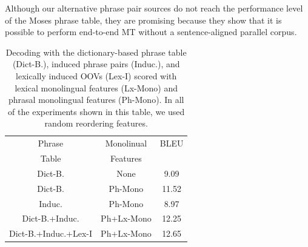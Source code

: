 \documentclass[11pt]{article}
\begin{document}
Although our alternative phrase pair sources do not reach the performance level of the Moses phrase table, they are promising because they show that it is possible to perform end-to-end MT without a sentence-aligned parallel corpus. %



\begin{table}
\small
\begin{center}
\begin{tabular}{|c|c|c|}
\hline
Phrase 	& Monolinual  & 	BLEU \\
Table	& Features &  \\
\hline
Dict-B. & None & 9.09 \\
Dict-B. & Ph-Mono & 11.52 \\
Induc. & Ph-Mono &  8.97 \\
Dict-B.+Induc. & Ph+Lx-Mono & 12.25 \\
Dict-B.+Induc.+Lex-I & Ph+Lx-Mono & 12.65 \\
\hline
\end{tabular}
\caption{Decoding with the dictionary-based phrase table (Dict-B.), induced phrase pairs (Induc.), and lexically induced OOVs (Lex-I) scored with lexical monolingual features (Lx-Mono) and phrasal monolingual features (Ph-Mono). In all of the experiments shown in this table, we used random reordering features.}\label{table:new-phrase-tables}
\end{center}
\end{table}
\end{document}

